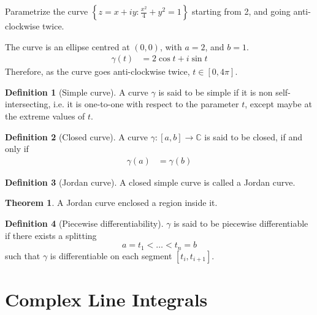 \documentclass[titlepage, fleqn, a4paper, 12pt, twoside]{article}
\theoremstyle{definition}
\newtheorem{definition}{Definition}
\theoremstyle{theorem}
\newtheorem{theorem}{Theorem}
\begin{document}
\begin{question}
	Parametrize the curve ${\left\{ z = x + i y : \frac{x^2}{4} + y^2 = 1 \right\}}$ starting from 2, and going anti-clockwise twice.
\end{question}

\begin{solution}
	The curve is an ellipse centred at $(0,0)$, with $a = 2$, and $b = 1$.
	\begin{align*}
		\gamma(t) & = 2 \cos t + i \sin t
	\end{align*}
	Therefore, as the curve goes anti-clockwise twice, $t \in [0,4 \pi]$.
\end{solution}

\begin{definition}[Simple curve]
	A curve $\gamma$ is said to be simple if it is non self-intersecting, i.e. it is one-to-one with respect to the parameter $t$, except maybe at the extreme values of $t$.
\end{definition}

\begin{definition}[Closed curve]
	A curve $\gamma : [a,b] \to \mathbb{C}$ is said to be closed, if and only if
	\begin{align*}
		\gamma(a) & = \gamma(b)
	\end{align*}
\end{definition}

\begin{definition}[Jordan curve]
	A closed simple curve is called a Jordan curve.
\end{definition}

\begin{theorem}
	A Jordan curve enclosed a region inside it.
\end{theorem}

\begin{definition}[Piecewise differentiability]
	$\gamma$ is said to be piecewise differentiable if there exists a splitting
	\begin{equation*}
		a = t_1 < \dots < t_n = b
	\end{equation*}
	such that $\gamma$ is differentiable on each segment $[t_i,t_{i + 1}]$.
\end{definition}

\section{Complex Line Integrals}
\end{document}
